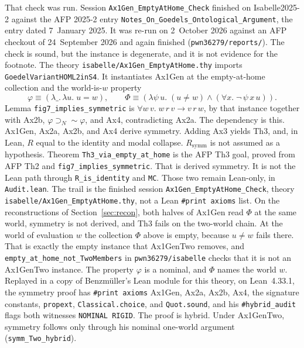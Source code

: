 \documentclass[11pt,a4paper]{article}
\newcommand{\necImp}{\supset_{N}}
\newcommand{\lean}[1]{\texttt{#1}}
\theoremstyle{definition}
\theoremstyle{remark}
\begin{document}
That check was run.
Session \lean{Ax1Gen\_EmptyAtHome\_Check} finished on Isabelle2025-2 against
the AFP 2025-2 entry \lean{Notes\_On\_Goedels\_Ontological\_Argument}, the
entry dated 7~January 2025.
It was re-run on 2~October 2026 against an AFP checkout of 24~September 2026
and again finished (\lean{pwn36279/reports/}).
The check is sound, but the instance is degenerate, and it is not evidence
for the footnote.
The theory \lean{isabelle/Ax1Gen\_EmptyAtHome.thy} imports
\lean{GoedelVariantHOML2inS4}.
It instantiates Ax1Gen at the empty-at-home collection and the world-is-\(w\)
property
\[
  \varphi \equiv (\lambda\_.\,\lambda u.\; u = w),
  \qquad
  \Phi \equiv
    (\lambda\psi\,u.\; (u \neq w) \land (\forall x.\; \neg\,\psi\,x\,u)).
\]
Lemma \lean{fig7\_implies\_symmetric} is
\(\forall w\,v.\; w\,r\,v \longrightarrow v\,r\,w\), by that instance together
with Ax2b, \(\varphi \necImp {\sim}\varphi\), and Ax4, contradicting Ax2a.
The dependency is this.
Ax1Gen, Ax2a, Ax2b, and Ax4 derive symmetry.
Adding Ax3 yields Th3, and, in Lean, \(R\) equal to the identity and modal
collapse.
\(R_{\mathrm{symm}}\) is not assumed as a hypothesis.
Theorem \lean{Th3\_via\_empty\_at\_home} is the AFP Th3 goal, proved from AFP
Th2 and \lean{fig7\_implies\_symmetric}.
That is derived symmetry.
It is not the Lean path through \lean{R\_is\_identity} and \lean{MC}.
Those two remain Lean-only, in \lean{Audit.lean}.
The trail is the finished session
\lean{Ax1Gen\_EmptyAtHome\_Check}, theory
\lean{isabelle/Ax1Gen\_EmptyAtHome.thy}, not a Lean \lean{\#print axioms}
list.
On the reconstructions of Section~\ref{sec:recon}, both halves of Ax1Gen read
\(\Phi\) at the same world, symmetry is not derived, and Th3 fails on the
two-world chain.
At the world of evaluation \(w\) the collection \(\Phi\) above is empty,
because \(u \neq w\) fails there.
That is exactly the empty instance that Ax1GenTwo removes, and
\lean{empty\_at\_home\_not\_TwoMembers} in \lean{pwn36279/isabelle} checks
that it is not an Ax1GenTwo instance.
The property \(\varphi\) is a nominal, and \(\Phi\) names the world \(w\).
Replayed in a copy of Benzm\"uller's Lean module for this theory, on
Lean~4.33.1, the symmetry proof has \lean{\#print axioms} Ax1Gen, Ax2a,
Ax2b, Ax4, the signature constants, \lean{propext},
\lean{Classical.choice}, and \lean{Quot.sound}, and his
\lean{\#hybrid\_audit} flags both witnesses \lean{NOMINAL RIGID}.
The proof is hybrid.
Under Ax1GenTwo, symmetry follows only through his nominal one-world argument
(\lean{symm\_Two\_hybrid}).
\end{document}
